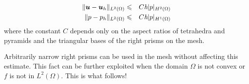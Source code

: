 \begin{corollary}
\begin{eqnarray*}
\|\boldsymbol{u}-\boldsymbol{u}_h\|_{L^2(\Omega)}&\leqslant& C\textit{h}|p|_{H^2(\Omega)}\\ 
\|p-p_h\|_{L^2(\Omega)}&\leqslant& C\textit{h}|p|_{H^1(\Omega)}
\end{eqnarray*}
where the constant $C$ depends only on the aspect ratios of tetrahedra 
and pyramids and the triangular bases of the right prisms on the mesh. 
\end{corollary}

Arbitrarily narrow right prisms can be used in the mesh without 
affecting this estimate. This fact can be further exploited when the
domain $\Omega$ is not convex or $f$ is not in $L^2(\Omega)$. This is what follows!
